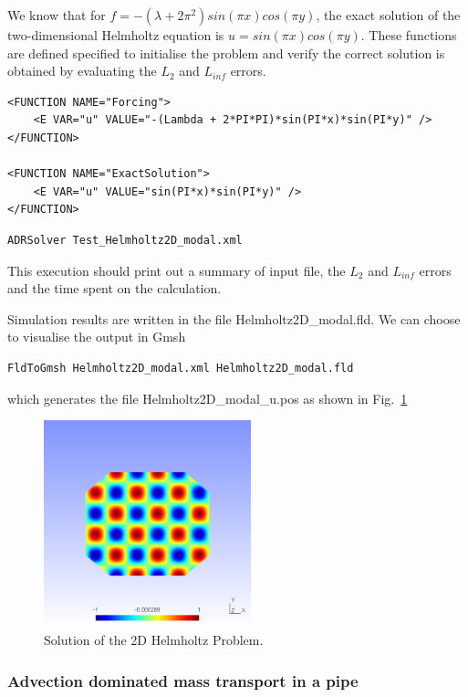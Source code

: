We know that for $f = -(\lambda + 2 \pi^2)sin(\pi x)cos(\pi y)$, the exact 
solution of the two-dimensional Helmholtz equation is $u = sin(\pi x)cos(\pi
y)$. These functions are defined specified to initialise the problem and verify
the correct solution is obtained by evaluating the $L_2$ and $L_{inf}$ errors.
\begin{lstlisting}[style=XMLStyle]
<FUNCTION NAME="Forcing">
    <E VAR="u" VALUE="-(Lambda + 2*PI*PI)*sin(PI*x)*sin(PI*y)" />
</FUNCTION>

<FUNCTION NAME="ExactSolution">
    <E VAR="u" VALUE="sin(PI*x)*sin(PI*y)" />
</FUNCTION>
\end{lstlisting}


\begin{lstlisting}[style=BashInputStyle]
ADRSolver Test_Helmholtz2D_modal.xml
\end{lstlisting}

This execution should print out a summary of input file, the $L_2$ and 
$L_{inf}$ errors and the time spent on the calculation.

Simulation results are written in the file Helmholtz2D\_modal.fld. We can choose
to visualise the output in Gmsh
\begin{lstlisting}[style=BashInputStyle]
FldToGmsh Helmholtz2D_modal.xml Helmholtz2D_modal.fld
\end{lstlisting}
which generates the file Helmholtz2D\_modal\_u.pos as shown in
Fig.~\ref{f:adrsolver:helmholtz2D}

\begin{figure}
\begin{center}
\includegraphics[width=6cm]{img/Helmholtz2D}
\caption{Solution of the 2D Helmholtz Problem.}
\label{f:adrsolver:helmholtz2D}
\end{center}
\end{figure}


\subsubsection{Advection dominated mass transport in a pipe}


